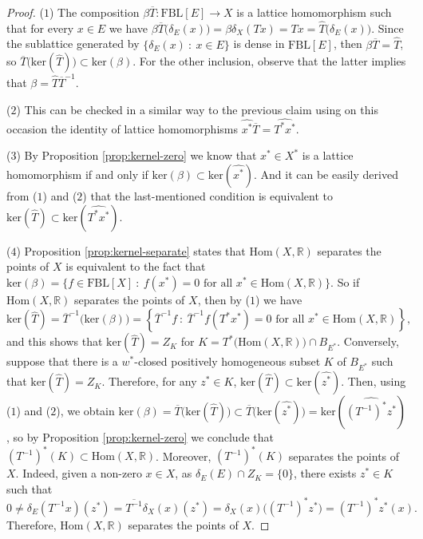 \documentclass[11pt]{amsart}
\theoremstyle{definition}
\numberwithin{equation}{section}
\newcommand{\fbl}{\text{FBL}}
\begin{document}
\begin{proof} ($1$) The composition $\beta \overline{T}:\fbl[E]\to X$ is a lattice homomorphism such that for every $x\in E$ we have
$
\beta \overline{T}\bigl(\delta_E(x)\bigr)=\beta \delta_X (Tx)=Tx=\widehat{T}\bigl(\delta_E(x)\bigr)
$. Since the sublattice generated by $\{\delta_E(x)\::\:x\in E\}$ is dense in $\fbl[E]$, then $\beta \overline{T}=\widehat{T}$, so $\overline{T}\bigl(\text{ker}(\widehat{T})\bigr)\subset\text{ker}(\beta)$. For the other inclusion, observe that the latter implies that $\beta=\widehat{T}\overline{T}^{-1}$.

\noindent ($2$) This can be checked in a similar way to the previous claim using on this occasion the identity of lattice homomorphisms $\widehat{x^*}\overline{T}=\widehat{T^*x^*}$.

\noindent ($3$)  By Proposition \ref{prop:kernel-zero} we know that $x^*\in X^*$ is a lattice homomorphism if and only if $\text{ker}(\beta)\subset \text{ker}(\widehat{x^*})$. And it can be easily derived from ($1$) and ($2$) that the last-mentioned condition is equivalent to $\text{ker}(\widehat{T})\subset \text{ker}(\widehat{T^*x^*})$.

\noindent ($4$) Proposition \ref{prop:kernel-separate} states that $\text{Hom}(X,\mathbb{R})$ separates the points of $X$ is equivalent to the fact that $\text{ker}(\beta)=\{f\in\fbl[X]\::\: f(x^*)=0 \text{ for all } x^*\in\text{Hom}(X,\mathbb{R})\}$. So if $\text{Hom}(X,\mathbb{R})$ separates the points of $X$, then by ($1$) we have
$$
\text{ker}(\widehat{T})=\overline{T}^{-1}\bigl(\text{ker}(\beta)\bigr)=\left\{\overline{T}^{-1}f\::\: \overline{T}^{-1}f(T^*x^*)=0 \text{ for all } x^*\in\text{Hom}(X,\mathbb{R})\right\},
$$
and this shows that $\text{ker}(\widehat{T})=Z_K$ for $K=T^*\bigl(\text{Hom}(X,\mathbb{R})\bigr)\cap B_{E^*}$. Conversely, suppose that there is a $w^*$-closed positively homogeneous subset $K$ of $B_{E^*}$ such that $\text{ker}(\widehat{T})=Z_K$. Therefore, for any $z^*\in K$, $\text{ker}(\widehat{T})\subset\text{ker}(\widehat{z^*})$. Then, using ($1$) and ($2$), we obtain $\text{ker}(\beta)=\overline{T}\bigl(\text{ker}(\widehat{T})\bigr)\subset \overline{T}\bigl(\text{ker}(\widehat{z^*})\bigr)=\text{ker}(\widehat{(T^{-1})^*z^*})$, so by Proposition \ref{prop:kernel-zero} we conclude that $(T^{-1})^*(K)\subset \text{Hom}(X,\mathbb{R})$. Moreover, $(T^{-1})^*(K)$ separates the points of $X$. Indeed, given a non-zero $x\in X$, as $\delta_E(E)\cap Z_K=\{0\}$, there exists $z^*\in K$ such that
$$
0\neq \delta_E(T^{-1}x)(z^*)=\overline{T^{-1}}\delta_X(x)(z^*)=\delta_X(x)\bigl((T^{-1})^*z^*\bigr)=(T^{-1})^*z^*(x).
$$
Therefore, $\text{Hom}(X,\mathbb{R})$ separates the points of $X$.
\end{proof}
\end{document}
